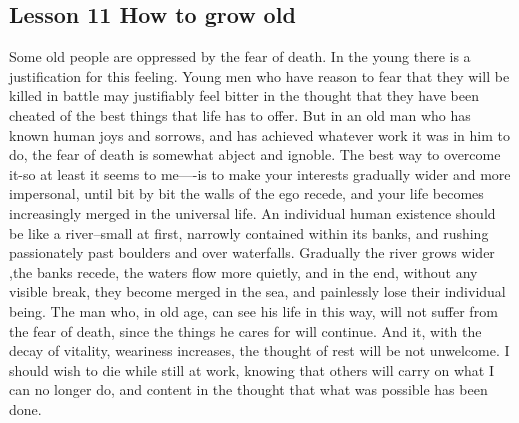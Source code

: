 \documentclass[kindlepaper]{BHCexam4kindle}
\begin{document}
\subsection{Lesson 11
How to grow old}
\par
Some old people are oppressed by the fear of death. In the young there is a justification for this feeling.
Young men who have reason to fear that they will be killed in battle may justifiably feel bitter in the thought
that they have been cheated of the best things that life has to offer. But in an old man who has known human
joys and sorrows, and has achieved whatever work it was in him to do, the fear of death is somewhat abject
and ignoble. The best way to overcome it-so at least it seems to me----is to make your interests gradually wider
and more impersonal, until bit by bit the walls of the ego recede, and your life becomes increasingly merged in
the universal life. An individual human existence should be like a river--small at first, narrowly contained
within its banks, and rushing passionately past boulders and over waterfalls. Gradually the river grows
wider ,the banks recede, the waters flow more quietly, and in the end, without any visible break, they become
merged in the sea, and painlessly lose their individual being. The man who, in old age, can see his life in this
way, will not suffer from the fear of death, since the things he cares for will continue. And it, with the decay of
vitality, weariness increases, the thought of rest will be not unwelcome. I should wish to die while still at work,
knowing that others will carry on what I can no longer do, and content in the thought that what was possible
has been done.
\clearpage
\end{document}
